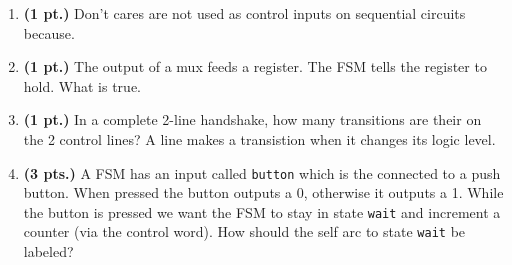 \documentclass{article}
\begin{document}
\begin{enumerate}
\pagebreak
\item{\bf(1 pt.)} Don't cares are not used as control inputs on sequential
circuits because.

\item{\bf(1 pt.)} The output of a mux feeds a register.  The FSM tells the
register to hold.  What is true.

\item{\bf(1 pt.)} In a complete 2-line handshake, how many transitions are
their on the 2 control lines?  A line makes a transistion when it changes
its logic level.

\item {\bf (3 pts.)} 
A FSM has an input called \verb+button+ which is the connected to 
a push button.  When pressed the button outputs a 0, 
otherwise it outputs a 1.  While the button is pressed we want 
the FSM to stay in state \verb+wait+ and increment a counter 
(via the control word).  How should the self arc to state 
\verb+wait+ be labeled?


\end{enumerate}
\end{document}
